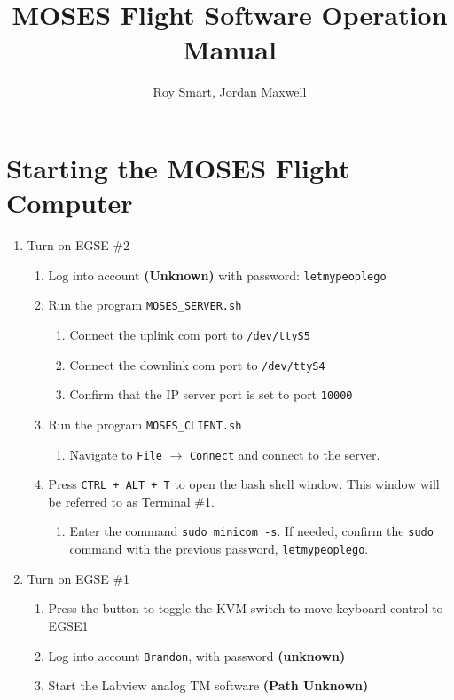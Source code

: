 \documentclass[10pt,a4paper,titlepage]{article}
\author{Roy Smart, Jordan Maxwell}
\title{MOSES Flight Software Operation Manual}
\begin{document}
\maketitle

\tableofcontents

\newpage

\section{Starting the MOSES Flight Computer}
\begin{enumerate}
	\item Turn on EGSE \#2
	\begin{enumerate}
		\item Log into account \textbf{(Unknown)} with password: \texttt{letmypeoplego}
		\item Run the program \texttt{MOSES\_SERVER.sh}
		\begin{enumerate}
			\item Connect the uplink com port to \texttt{/dev/ttyS5}
			\item Connect the downlink com port to \texttt{/dev/ttyS4}
			\item Confirm that the IP server port is set to port \texttt{10000}
		\end{enumerate}
		\item Run the program \texttt{MOSES\_CLIENT.sh}
		\begin{enumerate}
			\item Navigate to \texttt{File} $\rightarrow$ \texttt{Connect} and connect to the server.
		\end{enumerate}
		\item Press \texttt{CTRL + ALT + T} to open the bash shell window. This window will be referred to as Terminal \#1.
		\begin{enumerate}
			\item Enter the command \texttt{sudo minicom -s}. If needed, confirm the \texttt{sudo} command with the previous password, \texttt{letmypeoplego}.		
		\end{enumerate}
	\end{enumerate}
	\item Turn on EGSE \#1
	\begin{enumerate}
		\item Press the button to toggle the KVM switch to move keyboard control to EGSE1
		\item Log into account \texttt{Brandon}, with password \textbf{(unknown)}
		\item Start the Labview analog TM software \textbf{(Path Unknown)}

\end{enumerate}
\end{enumerate}
\end{document}
